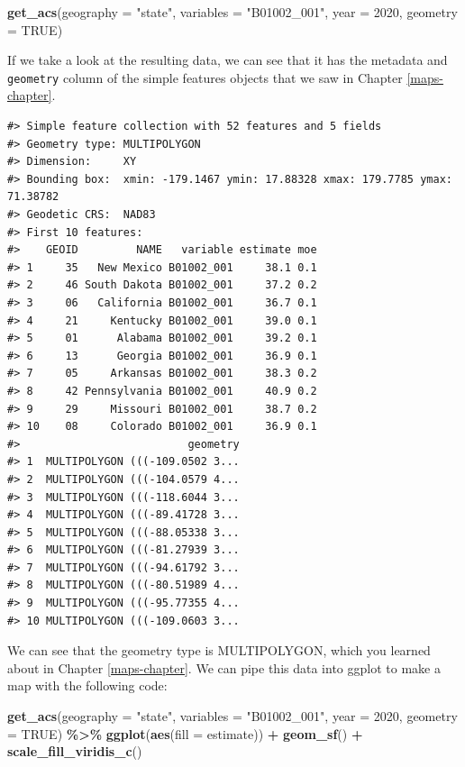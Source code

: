 \documentclass[
]{book}
\newenvironment{Shaded}{\begin{snugshade}}{\end{snugshade}}
\newcommand{\AttributeTok}[1]{\textcolor[rgb]{0.13,0.29,0.53}{#1}}
\newcommand{\ConstantTok}[1]{\textcolor[rgb]{0.56,0.35,0.01}{#1}}
\newcommand{\DecValTok}[1]{\textcolor[rgb]{0.00,0.00,0.81}{#1}}
\newcommand{\FunctionTok}[1]{\textcolor[rgb]{0.13,0.29,0.53}{\textbf{#1}}}
\newcommand{\NormalTok}[1]{#1}
\newcommand{\SpecialCharTok}[1]{\textcolor[rgb]{0.81,0.36,0.00}{\textbf{#1}}}
\newcommand{\StringTok}[1]{\textcolor[rgb]{0.31,0.60,0.02}{#1}}
\begin{document}
\begin{Shaded}
\begin{Highlighting}[]
\FunctionTok{get\_acs}\NormalTok{(}\AttributeTok{geography =} \StringTok{"state"}\NormalTok{,}
        \AttributeTok{variables =} \StringTok{"B01002\_001"}\NormalTok{,}
        \AttributeTok{year =} \DecValTok{2020}\NormalTok{,}
        \AttributeTok{geometry =} \ConstantTok{TRUE}\NormalTok{) }
\end{Highlighting}
\end{Shaded}

If we take a look at the resulting data, we can see that it has the metadata and \texttt{geometry} column of the simple features objects that we saw in Chapter \ref{maps-chapter}.

\begin{verbatim}
#> Simple feature collection with 52 features and 5 fields
#> Geometry type: MULTIPOLYGON
#> Dimension:     XY
#> Bounding box:  xmin: -179.1467 ymin: 17.88328 xmax: 179.7785 ymax: 71.38782
#> Geodetic CRS:  NAD83
#> First 10 features:
#>    GEOID         NAME   variable estimate moe
#> 1     35   New Mexico B01002_001     38.1 0.1
#> 2     46 South Dakota B01002_001     37.2 0.2
#> 3     06   California B01002_001     36.7 0.1
#> 4     21     Kentucky B01002_001     39.0 0.1
#> 5     01      Alabama B01002_001     39.2 0.1
#> 6     13      Georgia B01002_001     36.9 0.1
#> 7     05     Arkansas B01002_001     38.3 0.2
#> 8     42 Pennsylvania B01002_001     40.9 0.2
#> 9     29     Missouri B01002_001     38.7 0.2
#> 10    08     Colorado B01002_001     36.9 0.1
#>                          geometry
#> 1  MULTIPOLYGON (((-109.0502 3...
#> 2  MULTIPOLYGON (((-104.0579 4...
#> 3  MULTIPOLYGON (((-118.6044 3...
#> 4  MULTIPOLYGON (((-89.41728 3...
#> 5  MULTIPOLYGON (((-88.05338 3...
#> 6  MULTIPOLYGON (((-81.27939 3...
#> 7  MULTIPOLYGON (((-94.61792 3...
#> 8  MULTIPOLYGON (((-80.51989 4...
#> 9  MULTIPOLYGON (((-95.77355 4...
#> 10 MULTIPOLYGON (((-109.0603 3...
\end{verbatim}

We can see that the geometry type is MULTIPOLYGON, which you learned about in Chapter \ref{maps-chapter}. We can pipe this data into ggplot to make a map with the following code:

\begin{Shaded}
\begin{Highlighting}[]
\FunctionTok{get\_acs}\NormalTok{(}\AttributeTok{geography =} \StringTok{"state"}\NormalTok{,}
        \AttributeTok{variables =} \StringTok{"B01002\_001"}\NormalTok{,}
        \AttributeTok{year =} \DecValTok{2020}\NormalTok{,}
        \AttributeTok{geometry =} \ConstantTok{TRUE}\NormalTok{) }\SpecialCharTok{\%\textgreater{}\%} 
  \FunctionTok{ggplot}\NormalTok{(}\FunctionTok{aes}\NormalTok{(}\AttributeTok{fill =}\NormalTok{ estimate)) }\SpecialCharTok{+}
  \FunctionTok{geom\_sf}\NormalTok{() }\SpecialCharTok{+}
  \FunctionTok{scale\_fill\_viridis\_c}\NormalTok{()}
\end{Highlighting}
\end{Shaded}
\end{document}
